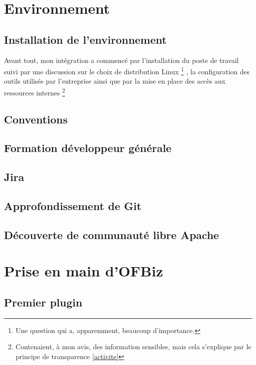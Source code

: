 \newpage









\section{Environnement}

\subsection{Installation de l'environnement}
Avant tout, mon intégration a commencé par l'installation du poste de travail suivi par une discussion sur le choix de distribution Linux \footnote{Une question qui a, apparemment, beaucoup d'importance.} , la configuration des outils utilisés par l'entreprise ainsi que par la mise en place des accès aux ressources internes \footnote{Contenaient, à mon avis, des information sensibles, mais cela s'explique par le principe de transparence \ref{activite} }



\subsection{Conventions}
\subsection{Formation développeur générale}
\subsection{Jira}
\subsection{Approfondissement de Git }
\subsection{Découverte de communauté libre Apache}

\newpage
\section{Prise en main d'OFBiz}

\subsection{Premier plugin}


